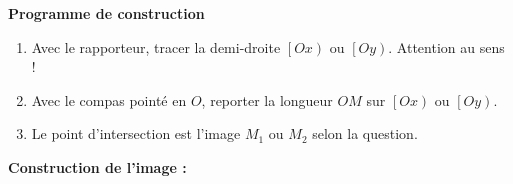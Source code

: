 \begin{methode*1}
\begin{minipage}{0.45\linewidth}
    \end{minipage}
    \begin{minipage}{0.55\linewidth}
        \textbf{Programme de construction}
        \begin{enumerate}
            \item Avec le rapporteur, tracer la demi-droite $\left[Ox\right)$ ou $\left[Oy\right)$. Attention au sens !
            \item Avec le compas pointé en $O$, reporter la longueur $OM$ sur $\left[Ox\right)$ ou $\left[Oy\right)$.
            \item Le point d'intersection est l'image $M_1$ ou $M_2$ selon la question.
        \end{enumerate}
    \end{minipage}
    \begin{myBox}{}
        \textbf{Construction de l'image :}


        \creditInstrumentPoche
    \end{myBox}
\end{methode*1}
